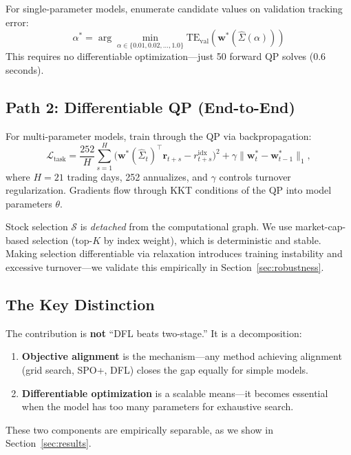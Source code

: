 \documentclass[11pt]{article}
\newcommand{\bw}{\mathbf{w}}
\newcommand{\br}{\mathbf{r}}
\newcommand{\bSigma}{\hat{\Sigma}}
\newcommand{\cS}{\mathcal{S}}
\newcommand{\cL}{\mathcal{L}}
\begin{document}
For single-parameter models, enumerate candidate values on validation tracking error:
\begin{equation}
  \alpha^* = \arg\min_{\alpha \in \{0.01, 0.02, \ldots, 1.0\}} \text{TE}_{\text{val}}(\bw^*(\bSigma(\alpha)))
\end{equation}
This requires no differentiable optimization---just 50 forward QP solves (0.6 seconds).

\subsection{Path 2: Differentiable QP (End-to-End)}

For multi-parameter models, train through the QP via backpropagation:
\begin{equation}
  \cL_{\text{task}} = \frac{252}{H} \sum_{s=1}^{H} \bigl(\bw^*(\bSigma_t)^\top \br_{t+s} - r_{t+s}^{\text{idx}}\bigr)^2 + \gamma \|\bw^*_t - \bw^*_{t-1}\|_1,
  \label{eq:task}
\end{equation}
where $H=21$ trading days, 252 annualizes, and $\gamma$ controls turnover regularization. Gradients flow through KKT conditions of the QP \citep{agrawal2019differentiable} into model parameters $\theta$.

Stock selection $\cS$ is \emph{detached} from the computational graph. We use market-cap-based selection (top-$K$ by index weight), which is deterministic and stable. Making selection differentiable via relaxation introduces training instability and excessive turnover---we validate this empirically in Section~\ref{sec:robustness}.

\subsection{The Key Distinction}

The contribution is \textbf{not} ``DFL beats two-stage.'' It is a decomposition:
\begin{enumerate}[nosep]
  \item \textbf{Objective alignment} is the mechanism---any method achieving alignment (grid search, SPO+, DFL) closes the gap equally for simple models.
  \item \textbf{Differentiable optimization} is a scalable means---it becomes essential when the model has too many parameters for exhaustive search.
\end{enumerate}
These two components are empirically separable, as we show in Section~\ref{sec:results}.
\end{document}
